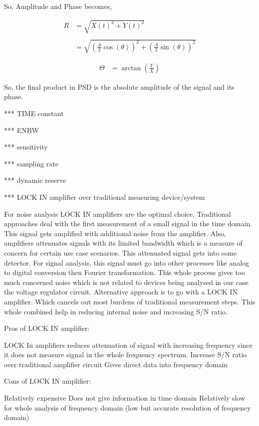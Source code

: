 \documentclass[final,5p,12pt,twocolumn]{elsaarticle}
\begin{document}
So, Amplitude and Phase becomes, 

\begin{align*}
R & = \sqrt{X(t)^2+Y(t)^2}\\
\\
& =  \sqrt{(\frac{A}{2}\cos(\theta))^2+(\frac{A}{2}\sin(\theta))^2}
\end{align*}

\begin{align*}
\Theta & = \arctan(\frac{Y}{X})
\end{align*}

So, the final product in PSD is the absolute amplitude of the signal and its phase. 

*** TIME constant 

*** ENBW

*** sensitivity 

*** sampling rate

*** dynamic reserve

*** LOCK IN amplifier over traditional measuring device/system 

For noise analysis LOCK IN amplifiers are the optimal choice. Traditional approaches deal with the first measurement of a small signal in the time domain. This signal gets amplified with additional noise from the amplifier. Also, amplifiers attenuates signals with its limited bandwidth which is a measure of concern for certain use case scenarios. This attenuated signal gets into some detector. For signal analysis, this signal must go into other  processes like analog to digital conversion then Fourier transformation. This whole process gives too much concerned noise which is not related to devices being analysed in our case the voltage regulator circuit. Alternative approach is to go with a LOCK IN amplifier. Which cancels out most burdens of traditional measurement steps. This whole combined help in reducing internal noise and increasing S/N ratio.

Pros of LOCK IN amplifier: 

LOCK In amplifiers reduces attenuation of signal with increasing frequency since it does not measure signal in the whole frequency spectrum.
Increase S/N ratio over traditional amplifier circuit
Gives direct data into frequency domain

Cons of LOCK IN amplifier:

Relatively expensive
Does not give information in time domain
Relatively slow for whole analysis of frequency domain (low but accurate resolution of frequency domain)
\end{document}

